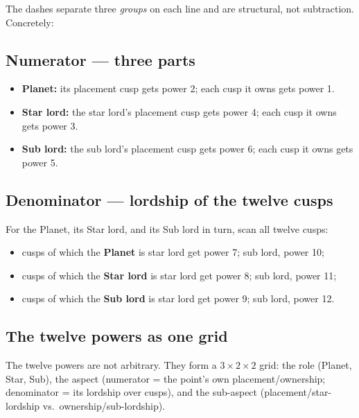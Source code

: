 \documentclass[11pt, a4paper]{article}
\begin{document}
The dashes separate three \emph{groups} on each line and are structural, not
subtraction. Concretely:

\subsection{Numerator --- three parts}

\begin{itemize}[leftmargin=1.4em]
  \item \textbf{Planet:} its placement cusp gets power 2; each cusp it owns gets
    power 1.
  \item \textbf{Star lord:} the star lord's placement cusp gets power 4; each
    cusp it owns gets power 3.
  \item \textbf{Sub lord:} the sub lord's placement cusp gets power 6; each cusp
    it owns gets power 5.
\end{itemize}

\subsection{Denominator --- lordship of the twelve cusps}

For the Planet, its Star lord, and its Sub lord in turn, scan all twelve cusps:

\begin{itemize}[leftmargin=1.4em]
  \item cusps of which the \textbf{Planet} is star lord get power 7; sub lord,
    power 10;
  \item cusps of which the \textbf{Star lord} is star lord get power 8; sub
    lord, power 11;
  \item cusps of which the \textbf{Sub lord} is star lord get power 9; sub
    lord, power 12.
\end{itemize}

\subsection{The twelve powers as one grid}

The twelve powers are not arbitrary. They form a $3\times2\times2$ grid: the
role (Planet, Star, Sub), the aspect (numerator = the point's own
placement/ownership; denominator = its lordship over cusps), and the sub-aspect
(placement/star-lordship vs.\ ownership/sub-lordship).
\end{document}
